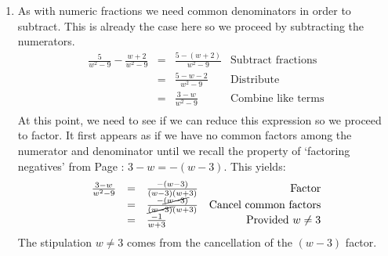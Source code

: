\documentclass{ximera}
\begin{document}
\begin{example}
\begin{explanation}
\begin{enumerate}
\[\begin{array}{rclr}
& = & \frac{(2x+1)\cancel{(x-3)}x^3\cancel{(x^2+2)}}{(x^2-2)\cancel{(x^2+2)}\cancel{(x-3)}(x+1)} & \text{Cancel common factors} \\  

& = & \frac{x^3(2x+1)}{(x+1)(x^2-2)} & \text{Provided $x \neq 3$} \\

\end{array}\]

The `$x \neq 3$' is mentioned since a factor of $(x-3)$ was canceled as we reduced the expression.  We also canceled a factor of $(x^2+2)$.  Why is there no stipulation as a result of canceling this factor? Because $x^2 + 2 \neq 0$ for all real $x$. (See Section \ref{AppCmpNums} for details.)  At this point, we \textit{could} go ahead and multiply out the numerator and denominator to get \[\frac{x^3(2x+1)}{(x+1)(x^2-2)}  = \frac{2x^4 + x^3}{x^3+x^2-2x-2}\] but for most of the applications where this kind of algebra is needed (solving equations, for instance), it is best to leave things factored.  Your instructor will let you know whether to leave your answer in factored form or not.\footnote{Speaking of factoring, do you remember why $x^2-2$ can't be factored over the integers?}

\item  As with numeric fractions we need common denominators in order to subtract.  This is already the case here so we proceed by subtracting the numerators. \[ \begin{array}{rclr}

\frac{5}{w^2 - 9} - \frac{w+2}{w^2-9} & = & \frac{5 - (w+2)}{w^2 - 9}& \text{Subtract fractions}\\  
                                        & = & \frac{5 - w - 2}{w^2-9} & \text{Distribute} \\  
																				& = & \frac{3-w}{w^2-9} & \text{Combine like terms} \\ \end{array}\]
At this point, we need to see if we can reduce this expression so we proceed to factor.  It first appears as if we have no common factors among the numerator and denominator until we recall the property of `factoring negatives' from Page \pageref{propertiesofnegatives}:  $3-w = -(w-3)$. This yields:\[ \begin{array}{rclr}

\frac{3-w}{w^2-9} & = & \frac{-(w-3)}{(w-3)(w+3)} & \text{Factor} \\  
                   & = & \frac{-\cancel{(w-3)}}{\cancel{(w-3)}(w+3)} & \text{Cancel common factors} \\  
									 & = & \frac{-1}{w+3} & \text{Provided $w \neq 3$} \\ 
									\end{array}\]
The stipulation $w \neq 3$ comes from the cancellation of the $(w-3)$ factor.


\end{enumerate}
\end{explanation}
\end{example}
\end{document}
